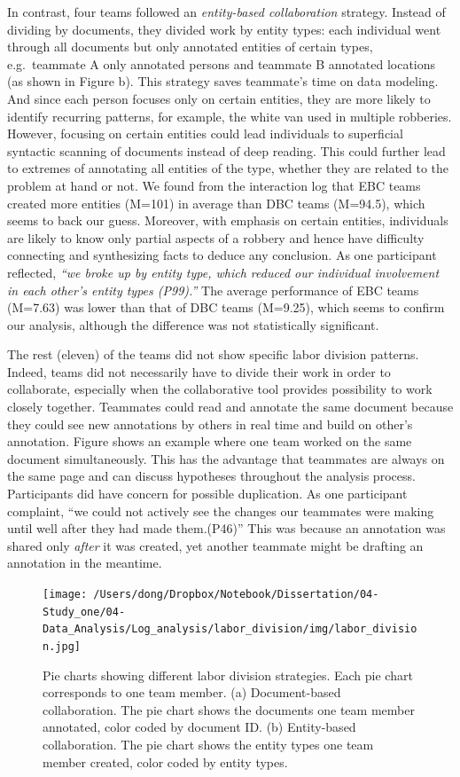 In contrast, four teams followed an \emph{entity-based collaboration}
strategy. Instead of dividing by documents, they divided work by entity
types: each individual went through all documents but only annotated
entities of certain types, e.g.~teammate A only annotated persons and
teammate B annotated locations (as shown in Figure
\autocite{fig:labor_division}b). This strategy saves teammate's time on
data modeling. And since each person focuses only on certain entities,
they are more likely to identify recurring patterns, for example, the
white van used in multiple robberies. However, focusing on certain
entities could lead individuals to superficial syntactic scanning of
documents instead of deep reading. This could further lead to extremes
of annotating all entities of the type, whether they are related to the
problem at hand or not. We found from the interaction log that EBC teams
created more entities (M=101) in average than DBC teams (M=94.5), which
seems to back our guess. Moreover, with emphasis on certain entities,
individuals are likely to know only partial aspects of a robbery and
hence have difficulty connecting and synthesizing facts to deduce any
conclusion. As one participant reflected, \emph{``we broke up by entity
type, which reduced our individual involvement in each other's entity
types (P99).''} The average performance of EBC teams (M=7.63) was lower
than that of DBC teams (M=9.25), which seems to confirm our analysis,
although the difference was not statistically significant.

The rest (eleven) of the teams did not show specific labor division
patterns. Indeed, teams did not necessarily have to divide their work in
order to collaborate, especially when the collaborative tool provides
possibility to work closely together. Teammates could read and annotate
the same document because they could see new annotations by others in
real time and build on other's annotation. Figure
\autocite{fig:close_collaboration} shows an example where one team
worked on the same document simultaneously. This has the advantage that
teammates are always on the same page and can discuss hypotheses
throughout the analysis process. Participants did have concern for
possible duplication. As one participant complaint, ``we could not
actively see the changes our teammates were making until well after they
had made them.(P46)'' This was because an annotation was shared only
\emph{after} it was created, yet another teammate might be drafting an
annotation in the meantime.

\begin{figure}
\centering
\texttt{[image: /Users/dong/Dropbox/Notebook/Dissertation/04-Study\_one/04-Data\_Analysis/Log\_analysis/labor\_division/img/labor\_division.jpg]}
\caption{Pie charts showing different labor division strategies. Each
pie chart corresponds to one team member. (a) Document-based
collaboration. The pie chart shows the documents one team member
annotated, color coded by document ID. (b) Entity-based collaboration.
The pie chart shows the entity types one team member created, color
coded by entity types.\label{fig:labor_division}}
\end{figure}

